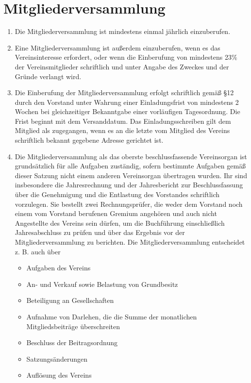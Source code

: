 \documentclass[a4paper,11pt]{scrartcl}
\begin{document}
\section{Mitgliederversammlung}
\begin{enumerate}
  \item Die Mitgliederversammlung ist mindestens einmal jährlich einzuberufen.
  \item Eine Mitgliederversammlung ist außerdem einzuberufen, wenn es das 
    Vereinsinteresse erfordert, oder wenn die Einberufung von mindestens 23\% der 
    Vereinsmitglieder schriftlich und unter Angabe des Zweckes und der Gründe 
    verlangt wird.
  \item Die Einberufung der Mitgliederversammlung erfolgt schriftlich gemäß 
    §12 durch den Vorstand unter Wahrung einer Einladungsfrist von mindestens 2 
    Wochen bei gleichzeitiger Bekanntgabe einer vorläufigen Tagesordnung. Die 
    Frist beginnt mit dem Versanddatum. Das Einladungsschreiben gilt dem Mitglied 
    als zugegangen, wenn es an die letzte vom Mitglied des Vereins schriftlich 
    bekannt gegebene Adresse gerichtet ist.
  \item Die Mitgliederversammlung als das oberste beschlussfassende Vereinsorgan 
    ist grundsätzlich für alle Aufgaben zuständig, sofern bestimmte Aufgaben 
    gemäß dieser Satzung nicht einem anderen Vereinsorgan übertragen wurden. Ihr 
    sind insbesondere die Jahresrechnung und der Jahresbericht zur Beschlussfassung 
    über die Genehmigung und die Entlastung des Vorstandes schriftlich vorzulegen. 
    Sie bestellt zwei Rechnungsprüfer, die weder dem Vorstand noch einem vom 
    Vorstand berufenen Gremium angehören und auch nicht Angestellte des Vereins 
    sein dürfen, um die Buchführung einschließlich Jahresabschluss zu prüfen 
    und über das Ergebnis vor der Mitgliederversammlung zu berichten.
    Die Mitgliederversammlung entscheidet z. B. auch über
    \begin{itemize}
      \item Aufgaben des Vereins
      \item An- und Verkauf sowie Belastung von Grundbesitz
      \item Beteiligung an Gesellschaften
      \item Aufnahme von Darlehen, die die Summe der monatlichen Mitgliedsbeiträge 
        überschreiten
      \item Beschluss der Beitragsordnung
      \item Satzungsänderungen
      \item Auflösung des Vereins

\end{itemize}
\end{enumerate}
\end{document}
